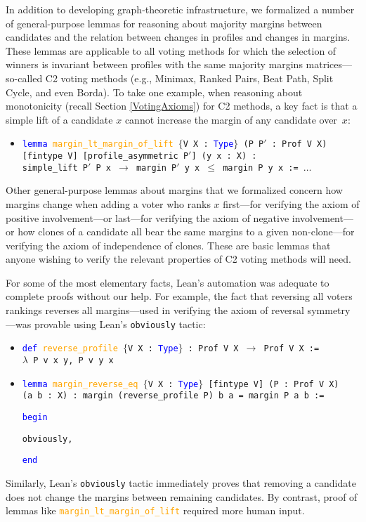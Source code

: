 \documentclass[runningheads]{llncs}
\begin{document}
In addition to developing graph-theoretic infrastructure, we formalized a number of general-purpose lemmas for reasoning about majority margins between candidates and the relation between changes in profiles and changes in margins. These lemmas are applicable to all voting methods for which the selection of winners is invariant between profiles with the same majority margins matrices---so-called C2 voting methods \cite{Fishburn1977} (e.g., Minimax, Ranked Pairs, Beat Path, Split Cycle, and even Borda). To take one example, when reasoning about monotonicity (recall Section \ref{VotingAxioms}) for C2 methods, a key fact is that a simple lift of a candidate $x$ cannot  increase the margin of any candidate over~$x$:
\begin{itemize}
\item[] \texttt{\textcolor{blue}{lemma} \textcolor{orange}{margin\_lt\_margin\_of\_lift}  $\{$V X : \textcolor{blue}{Type}$\}$ (P P$'$ : Prof V X)} \\  \texttt{[fintype V] [profile\_asymmetric P$'$] (y x : X) :} \\
\texttt{simple\_lift P$'$ P x $\to$ margin P$'$ y x $\leq$ margin P y x := $\dots$}
\end{itemize}
Other general-purpose lemmas about margins that we formalized concern how margins change when adding a voter who ranks $x$ first---for verifying the axiom of positive involvement---or last---for verifying the axiom of negative involvement---or how clones of a candidate all bear the same margins to a given non-clone---for verifying the axiom of independence of clones. These are basic lemmas that anyone wishing to verify the relevant properties of C2 voting methods will need. 

For some of the most elementary facts, Lean's automation was adequate to complete proofs without our help. For example, the fact that reversing all voters rankings reverses all margins---used in verifying the axiom of reversal symmetry---was provable using Lean's \texttt{obviously} tactic:

\begin{itemize}
\item[] \texttt{\textcolor{blue}{def} \textcolor{orange}{reverse\_profile} $\{$V X : \textcolor{blue}{Type}$\}$ : Prof V X $\to$ Prof V X := \\ $\lambda$ P v x y, P v y x} \\
\item[]  \texttt{\textcolor{blue}{lemma} \textcolor{orange}{margin\_reverse\_eq}  $\{$V X : \textcolor{blue}{Type}$\}$ [fintype V] (P : Prof V X)  \\}
\texttt{(a b : X) : margin (reverse\_profile P) b a = margin P a b :=}

\texttt{\textcolor{blue}{begin}}

  \quad \texttt{obviously,}
  
\texttt{\textcolor{blue}{end}}
\end{itemize}
Similarly, Lean's \texttt{obviously} tactic immediately proves that removing a candidate does not change the margins between remaining candidates. By contrast, proof of lemmas like \texttt{\textcolor{orange}{margin\_lt\_margin\_of\_lift}} required more human input.
\end{document}
